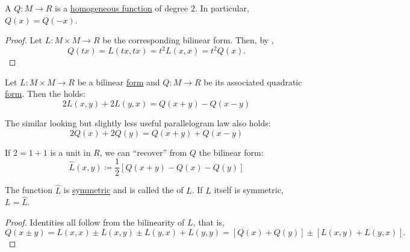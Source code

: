 \begin{proposition}\label{thm:bilinear_forms_vs_to_quadratic_forms}
  A  \( Q: M \to R \) is a \hyperref[def:homogenous_function]{homogeneous function} of degree \( 2 \). In particular, \( Q(x) = Q(-x) \).
\end{proposition}
\begin{proof}
  Let \( L: M \times M \to R \) be the corresponding bilinear form. Then, by ,
  \begin{equation*}
    Q(tx) = L(tx, tx) = t^2 L(x, x) = t^2 Q(x).
  \end{equation*}
\end{proof}

\begin{proposition}\label{thm:polarization_identity}\mcite\cite{nLab:polarization_identity}
  Let \( L: M \times M \to R \) be a bilinear \hyperref[def:bilinear_form]{form} and \( Q: M \to R \) be its associated quadratic \hyperref[def:quadratic_form]{form}. Then the  holds:
  \begin{equation}\label{thm:polarization_identity/polarization_identity}
    2 L(x, y) + 2 L(y, x) = Q(x + y) - Q(x - y)
  \end{equation}

  The similar looking but slightly less useful parallelogram law also holds:
  \begin{equation}\label{thm:polarization_identity/parallelogram_law}
    2 Q(x) + 2 Q(y) = Q(x + y) + Q(x - y)
  \end{equation}

  If \( 2 = 1 + 1 \) is a unit in \( R \), we can \enquote{recover} from \( Q \) the bilinear form:
  \begin{equation}\label{thm:polarization_identity/symmetrization_definition}
    \hat L(x, y) \coloneqq \frac 1 2 \left[ Q(x + y) - Q(x) - Q(y) \right]
  \end{equation}

  The function \( \hat L \) is \hyperref[def:symmetric_function]{symmetric} and is called the  of \( L \). If \( L \) itself is symmetric, \( L = \hat L \).
\end{proposition}
\begin{proof}
  Identities  all follow from the bilinearity of \( L \), that is,
  \begin{equation*}
    Q(x \pm y)
    =
    L(x, x) \pm L(x, y) \pm L(y, x) + L(y, y)
    =
    [Q(x) + Q(y)] \pm [L(x, y) + L(y, x)].
  \end{equation*}
\end{proof}


